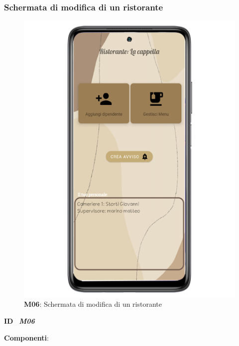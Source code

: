         \subsubsection{Schermata di modifica di un ristorante}
        \begin{figure}[H]
            \centering
            \includegraphics[scale=2]{assets/Mockup/Mockup_ResturantDash.png}
            \caption{\textbf{M06}: Schermata di modifica di un ristorante}\label{fig:Mockup_ResturantManager}
        \end{figure}
        \begin{flushleft}
            \textbf{ID} \ \Large{\textit{\textbf{M06}}}
        \end{flushleft}

        \textbf{Componenti}:


